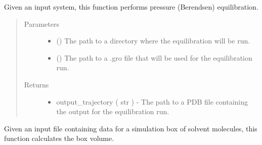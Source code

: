 \documentclass[letterpaper,12pt,english,openany,oneside]{sphinxmanual}
\begin{document}
\begin{fulllineitems}
\label{\detokenize{simulation:simulation.equilibrate}}
Given an input system, this function performs pressure (Berendsen) equilibration.
\begin{quote}\begin{description}
\item[{Parameters}] \leavevmode\begin{itemize}
\item {} 
 () \textendash{} The path to a directory where the equilibration will be run.

\item {} 
 () \textendash{} The path to a .gro file that will be used for the equilibration run.

\end{itemize}

\item[{Returns}] \leavevmode
\begin{itemize}
\item {} 
output\_trajectory ( str ) - The path to a PDB file containing the output for the equilibration run.

\end{itemize}


\end{description}\end{quote}

\end{fulllineitems}


\begin{fulllineitems}
\label{\detokenize{simulation:simulation.get_box_volume}}
Given an input file containing data for a simulation box of solvent molecules, this function calculates the box volume.

\end{fulllineitems}
\end{document}
